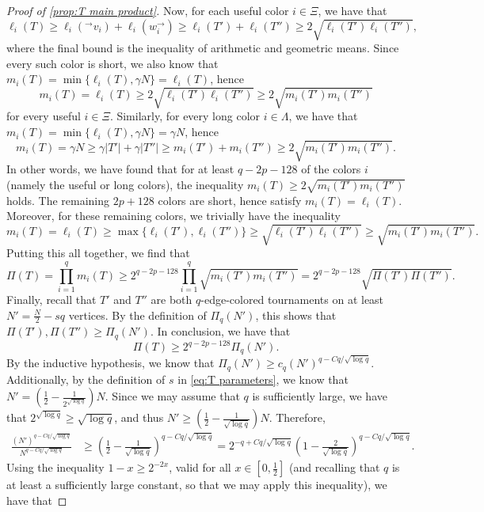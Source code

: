 \documentclass[10pt,a4paper]{amsart}
\newcommand\ab[1]{\lvert#1\rvert}
\begin{document}
\begin{proof}[Proof of \cref{prop:T main product}]
    Now, for each useful color $i \in \Xi$, we have that
    \[
        \ell_i(T) \geq \ell_i(^\to v_i)+\ell_i(w_i^\to) \geq \ell_i(T')+\ell_i(T'') \geq 2\sqrt{\ell_i(T') \ell_i(T'')},
    \]
    where the final bound is the inequality of arithmetic and geometric means. Since every such color is short, we also know that $m_i(T)=\min\{\ell_i(T),\gamma N\}=\ell_i(T)$, hence
    \[
        m_i(T)=\ell_i(T)\geq 2 \sqrt{\ell_i(T')\ell_i(T'')}\geq 2\sqrt{m_i(T')m_i(T'')}
    \]
    for every useful $i \in \Xi$.
    Similarly, for every long color $i \in \Lambda$, we have that $m_i(T)=\min\{\ell_i(T),\gamma N\}=\gamma N$, hence
    \[
        m_i(T) = \gamma N \geq \gamma \ab{T'}+\gamma \ab{T''} \geq m_i(T')+m_i(T'') \geq 2\sqrt{m_i(T')m_i(T'')}.
    \]
    In other words, we have found that for at least $q-2p-128$ of the colors $i$ (namely the useful or long colors), the inequality $m_i(T) \geq 2 \sqrt{m_i(T')m_i(T'')}$ holds. The remaining $2p+128$ colors are short, hence satisfy $m_i(T)=\ell_i(T)$. Moreover, for these remaining colors, we trivially have the inequality
    \[
        m_i(T)=\ell_i(T) \geq \max\{\ell_i(T'),\ell_i(T'')\} \geq \sqrt{\ell_i(T')\ell_i(T'')}\geq \sqrt{m_i(T')m_i(T'')}.
    \]
    Putting this all together, we find that
    \[
        \Pi(T) = \prod_{i=1}^q m_i(T) \geq 2^{q-2p-128} \prod_{i=1}^q\sqrt{m_i(T')m_i(T'')} = 2^{q-2p-128} \sqrt{\Pi(T')\Pi(T'')}.
    \]
    Finally, recall that $T'$ and $T''$ are both $q$-edge-colored tournaments on at least $N'=\frac N2-sq$ vertices. By the definition of $\Pi_q(N')$, this shows that $\Pi(T'), \Pi(T'') \geq \Pi_q(N')$. In conclusion, we have that
    \[
        \Pi(T) \geq 2^{q-2p-128} \Pi_q(N').
    \]
    By the inductive hypothesis, we know that $\Pi_q(N')\geq c_q (N')^{q-Cq/\sqrt{\log q}}$.
    Additionally, by the definition of $s$ in \eqref{eq:T parameters}, we know that $N' = (\frac 12-\frac{1}{2^{\sqrt{\log q}}})N$. Since we may assume that $q$ is sufficiently large, we have that $2^{\sqrt{\log q}}\geq \sqrt{\log q}$, and thus $N'\geq (\frac 12-\frac{1}{{\sqrt{\log q}}})N$.  Therefore,
    \begin{align*}
        \frac{(N')^{q-Cq/\sqrt{\log q}}}{N^{q-Cq/\sqrt{\log q}}} &\geq \left( \frac 12-\frac{1}{{\sqrt{\log q}}} \right)^{q-Cq/\sqrt{\log q}} = 2^{-q+Cq/\sqrt{\log q}} \left( 1-\frac{2}{{\sqrt{\log q}}} \right)^{q-Cq/\sqrt{\log q}}.
    \end{align*}
    Using the inequality $1-x \geq 2^{-2x}$, valid for all $x \in [0,\frac 12]$ (and recalling that $q$ is at least a sufficiently large constant, so that we may apply this inequality), we have that

\end{proof}
\end{document}
